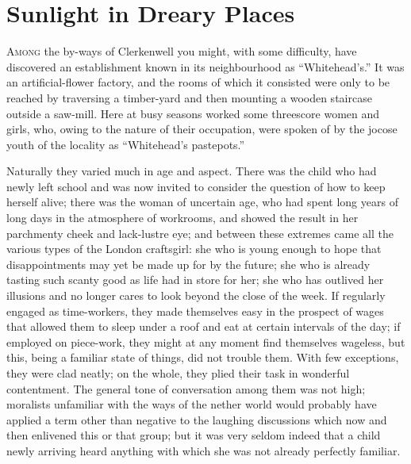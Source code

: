 \chapter{Sunlight in Dreary Places}

\textsc{Among} the by-ways of Clerkenwell you might, with some
difficulty, have discovered an establishment known in its neighbourhood
as ``Whitehead's.'' It was an artificial-flower factory, and the rooms
of which it consisted were only to be reached by traversing a
timber-yard and then mounting a wooden staircase outside a saw-mill.
Here at busy seasons worked some threescore women and girls, who, owing
to the nature of their occupation, were spoken of by the jocose youth of
the locality as ``Whitehead's pastepots.''

Naturally they varied much in age and aspect. There was the child who
had newly left school and was now invited to consider the question of
how to keep herself alive; there was the woman of uncertain age, who
{\protect\hypertarget{18}{}{}}had spent long years of long days in the
atmosphere of workrooms, and showed the result in her parchmenty cheek
and lack-lustre eye; and between these extremes came all the various
types of the London craftsgirl: she who is young enough to hope that
disappointments may yet be made up for by the future; she who is already
tasting such scanty good as life had in store for her; she who has
outlived her illusions and no longer cares to look beyond the close of
the week. If regularly engaged as time-workers, they made themselves
easy in the prospect of wages that allowed them to sleep under a roof
and eat at certain intervals of the day; if employed on piece-work, they
might at any moment find themselves wageless, but this, being a familiar
state of things, did not trouble them. With few exceptions, they were
clad neatly; on the whole, they plied their task in wonderful
contentment. The general tone of conversation among them was not high;
moralists unfamiliar with the ways of the nether world would probably
have applied a term other {\protect\hypertarget{19}{}{}}than negative to
the laughing discussions which now and then enlivened this or that
group; but it was very seldom indeed that a child newly arriving heard
anything with which she was not already perfectly familiar.

